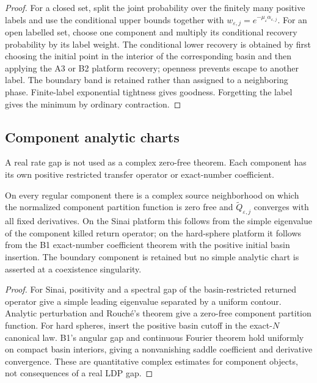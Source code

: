 \begin{proof}
For a closed set, split the joint probability over the finitely many positive
labels and use the conditional upper bounds together with
\(w_{\varepsilon,j}=e^{-\mu_\varepsilon\alpha_{\varepsilon,j}}\).  For an open labelled set, choose one component and
multiply its conditional recovery probability by its label weight.  The
conditional lower recovery is obtained by first choosing the initial point in
the interior of the corresponding basin and then applying the A3 or B2
platform recovery; openness prevents escape to another label.  The boundary
band is retained rather than assigned to a neighboring phase.  Finite-label
exponential tightness gives goodness.  Forgetting the label gives the minimum
by ordinary contraction.
\end{proof}

\subsection{Component analytic charts}

A real rate gap is not used as a complex zero-free theorem.  Each component has
its own positive restricted transfer operator or exact-number coefficient.

\begin{theorem}
\label{thm:r16-d1-charts}
On every regular component there is a complex source neighborhood on which the
normalized component partition function is zero free and
\(\widetilde Q_{\varepsilon,j}\) converges with all fixed derivatives.  On the
Sinai platform this follows from the simple eigenvalue of the component killed
return operator; on the hard-sphere platform it follows from the B1
exact-number coefficient theorem with the positive initial basin insertion.
The boundary component is retained but no simple analytic chart is asserted
at a coexistence singularity.
\end{theorem}

\begin{proof}
For Sinai, positivity and a spectral gap of the basin-restricted returned
operator give a simple leading eigenvalue separated by a uniform contour.
Analytic perturbation and Rouch\'e's theorem give a zero-free component
partition function.  For hard spheres, insert the positive basin cutoff in the
exact-\(N\) canonical law.  B1's angular gap and continuous Fourier theorem
hold uniformly on compact basin interiors, giving a nonvanishing saddle
coefficient and derivative convergence.  These are quantitative complex
estimates for component objects, not consequences of a real LDP gap.
\end{proof}

